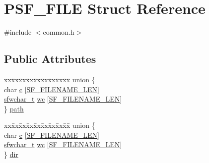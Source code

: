 \hypertarget{struct_p_s_f___f_i_l_e}{}\section{P\+S\+F\+\_\+\+F\+I\+LE Struct Reference}
\label{struct_p_s_f___f_i_l_e}


{\ttfamily \#include $<$common.\+h$>$}

\subsection*{Public Attributes}
\begin{DoxyCompactItemize}
\item 
\begin{tabbing}
xx\=xx\=xx\=xx\=xx\=xx\=xx\=xx\=xx\=\kill
union \{\\
\>char \hyperlink{struct_p_s_f___f_i_l_e_a5e8ec1f9af1c66d1680de3fdae2e32db}{c} \mbox{[}\hyperlink{libsndfile_2src_2common_8h_a5222b3875de92585fb297741c03e850c}{SF\_FILENAME\_LEN}\mbox{]}\\
\>\hyperlink{libsndfile_2src_2common_8h_a804b9fb983bf0783edcaff69ea5de097}{sfwchar\_t} \hyperlink{struct_p_s_f___f_i_l_e_a9ad5bb127092a92ea3556796dc56c4e2}{wc} \mbox{[}\hyperlink{libsndfile_2src_2common_8h_a5222b3875de92585fb297741c03e850c}{SF\_FILENAME\_LEN}\mbox{]}\\
\} \hyperlink{struct_p_s_f___f_i_l_e_ae23a10ddaa8dcb2be3c278d9a639bfcd}{path}\\

\end{tabbing}\item 
\begin{tabbing}
xx\=xx\=xx\=xx\=xx\=xx\=xx\=xx\=xx\=\kill
union \{\\
\>char \hyperlink{struct_p_s_f___f_i_l_e_a5e8ec1f9af1c66d1680de3fdae2e32db}{c} \mbox{[}\hyperlink{libsndfile_2src_2common_8h_a5222b3875de92585fb297741c03e850c}{SF\_FILENAME\_LEN}\mbox{]}\\
\>\hyperlink{libsndfile_2src_2common_8h_a804b9fb983bf0783edcaff69ea5de097}{sfwchar\_t} \hyperlink{struct_p_s_f___f_i_l_e_a9ad5bb127092a92ea3556796dc56c4e2}{wc} \mbox{[}\hyperlink{libsndfile_2src_2common_8h_a5222b3875de92585fb297741c03e850c}{SF\_FILENAME\_LEN}\mbox{]}\\
\} \hyperlink{struct_p_s_f___f_i_l_e_a73144bbf9531d78f55ace475aad0d5d5}{dir}\\


\end{tabbing}
\end{DoxyCompactItemize}
